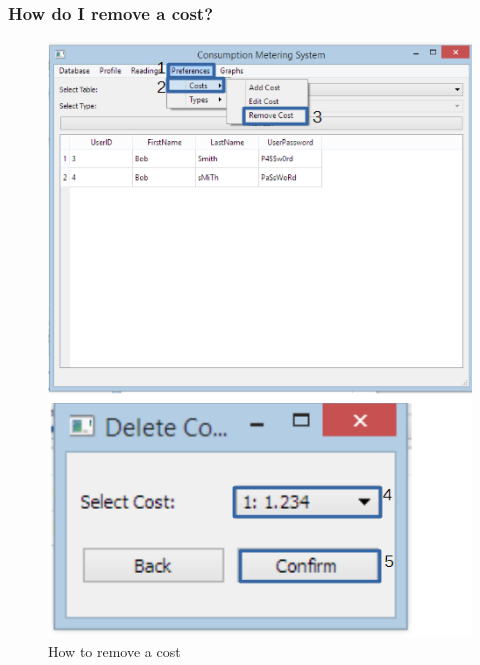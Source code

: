 \subsubsection{How do I remove a cost?}\label{question:remove_cost}
\begin{figure}[H]
	\includegraphics{./manual/images/remove_cost.png}
	\caption{How to remove a cost}
\end{figure}


